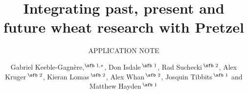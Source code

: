 \documentclass{bioinfo}
\begin{document}

\subtitle{APPLICATION NOTE}

\title[Pretzel]{Integrating past, present and future wheat research with Pretzel}
\author[Keeble-Gagn\`ere \textit{et~al}.]{Gabriel Keeble-Gagn\`ere,$^{\text{\sfb 1,}*}$,
Don Isdale\,$^{\text{\sfb 1}}$,
Rad Suchecki\,$^{\text{\sfb 2}}$,
Alex Kruger\,$^{\text{\sfb 2}}$,
Kieran Lomas\,$^{\text{\sfb 2}}$,
Alex Whan\,$^{\text{\sfb 2}}$,
Josquin Tibbits\,$^{\text{\sfb 1}}$
and Matthew Hayden\,$^{\text{\sfb 1}}$}
\address{$^{\text{\sf 1}}$Agriculture Victoria Research, AgriBio, 5 Ring Road, Bundoora, Victoria
3083, Australia and \\
$^{\text{\sf 2}}$CSIRO Agriculture and Food.}





\maketitle


\end{document}
